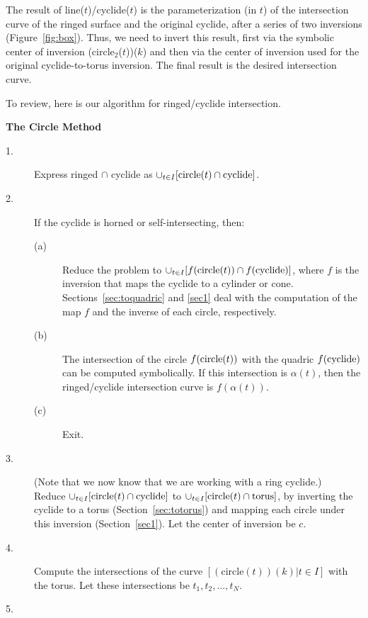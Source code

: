 The result of line($t$)/cyclide($t$) 
is the parameterization (in $t$) of the intersection curve of the ringed
surface and the original cyclide, after a series of two inversions
(Figure~\ref{fig:box}).
Thus, we need to invert this result,
first via the symbolic center of inversion (circle$_2$($t$))($k$)
and then via the center of inversion used for 
the original cyclide-to-torus inversion.
The final result is the desired intersection curve.

To review, here is our algorithm for ringed/cyclide intersection.

\ifFull
\vspace{.2in}
\else
\clearpage
\fi

\centerline{{\bf The Circle Method}}
\begin{description}
\item[1.]
	Express ringed $\cap$ cyclide as
		$\cup_{t \in I}[{\rm circle}(t) \cap {\rm cyclide}]$.
\item[2.]
	If the cyclide is horned or self-intersecting, 
	then:
\begin{description}
\item[(a)]
	Reduce the problem to 
	$\cup_{t \in I}[f({\rm circle}(t)) \cap f({\rm cyclide})]$,
	where $f$ is the inversion that maps the cyclide to a cylinder
 	or cone.  
	Sections~\ref{sec:toquadric} and \ref{sec1} 
	deal with the computation
	of the map $f$ and the inverse of each circle, respectively.
\item[(b)]
	The intersection of the circle $f({\rm circle}(t))$ with the
	quadric $f({\rm cyclide})$ can be computed symbolically.
	If this intersection is $\alpha(t)$, 
	then the ringed/cyclide intersection curve is 
	$f(\alpha(t))$.
\item[(c)]
	Exit.
\end{description}
\item[3.]
(Note that we now know that we are working with a ring cyclide.)\\
	Reduce $\cup_{t \in I}[{\rm circle}(t) \cap {\rm cyclide}]$
		to $\cup_{t \in I}[{\rm circle}(t) \cap {\rm torus}]$,
		by inverting the cyclide to a torus (Section~\ref{sec:totorus})
		and mapping each circle under this inversion 
		(Section~\ref{sec1}).
		Let the center of inversion be $c$.
\item[4.]
	Compute the intersections of the curve
		$[(\mbox{circle}(t))(k) | t \in I]$
		with the torus.  Let these intersections be
		$t_1,t_2,\ldots,t_N$.
\item[5.]

\end{description}
